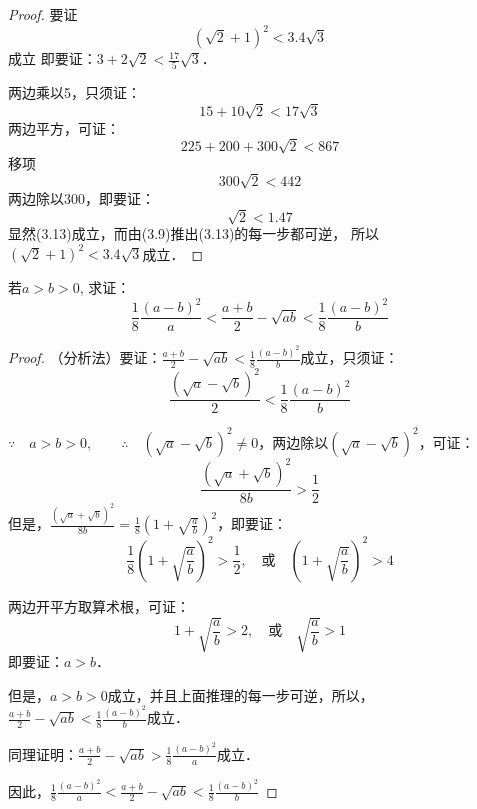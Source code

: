 \begin{proof}
要证
\begin{equation}
    \left(\sqrt{2}+1\right)^2 <3.4\sqrt{3}
\end{equation}
成立 即要证：$3+2\sqrt{2}<\frac{17}{5}\sqrt{3}$．

两边乘以5，只须证：
\begin{equation}
    15+10\sqrt{2}<17\sqrt{3}
\end{equation}
两边平方，可证：
\begin{equation}
    225+200+300\sqrt{2}<867
\end{equation}
移项
\begin{equation}
    300\sqrt{2}<442
\end{equation}
两边除以300，即要证：
\begin{equation}
    \sqrt{2}<1.47
\end{equation}
显然(3.13)成立，而由(3.9)推出(3.13)的每一步都可逆，
所以$\left(\sqrt{2}+1\right)^2 <3.4\sqrt{3}$成立．
\end{proof}
    
\begin{example}
    若$a>b>0$, 求证：
    \[\frac{1}{8}\frac{(a-b)^2}{a}<\frac{a+b}{2}-\sqrt{ab}<\frac{1}{8}\frac{(a-b)^2}{b} \]
\end{example}

\begin{proof}
    （分析法）要证：$\frac{a+b}{2}-\sqrt{ab}<\frac{1}{8}\frac{(a-b)^2}{b}$成立，只须证：
\[\frac{\left(\sqrt{a}-\sqrt{b}\right)^2}{2}<\frac{1}{8}\frac{(a-b)^2}{b}\]

$\because \quad a>b>0,\qquad \therefore\quad \left(\sqrt{a}-\sqrt{b}\right)^2\ne 0$，两边除以$\left(\sqrt{a}-\sqrt{b}\right)^2$，可证：
\[\frac{\left(\sqrt{a}+\sqrt{b}\right)^2}{8b}>\frac{1}{2}\]
但是，$\frac{\left(\sqrt{a}+\sqrt{b}\right)^2}{8b}=\frac{1}{8}\left(1+\sqrt{\frac{a}{b}}\right)^2$，即要证：
\[\frac{1}{8}\left(1+\sqrt{\frac{a}{b}}\right)^2>\frac{1}{2},\quad \text{或}\quad \left(1+\sqrt{\frac{a}{b}}\right)^2>4\]

两边开平方取算术根，可证：
\[1+\sqrt{\frac{a}{b}}>2,\quad \text{或}\quad \sqrt{\frac{a}{b}}>1\]
即要证：$a>b$．

但是，$a>b>0$成立，并且上面推理的每一步可逆，所以，
$\frac{a+b}{2}-\sqrt{ab}<\frac{1}{8}\frac{(a-b)^2}{b}$成立．

同理证明：$\frac{a+b}{2}-\sqrt{ab}>\frac{1}{8}\frac{(a-b)^2}{a}$成立．

因此，$\frac{1}{8}\frac{(a-b)^2}{a}<\frac{a+b}{2}-\sqrt{ab}<\frac{1}{8}\frac{(a-b)^2}{b}$
\end{proof}

